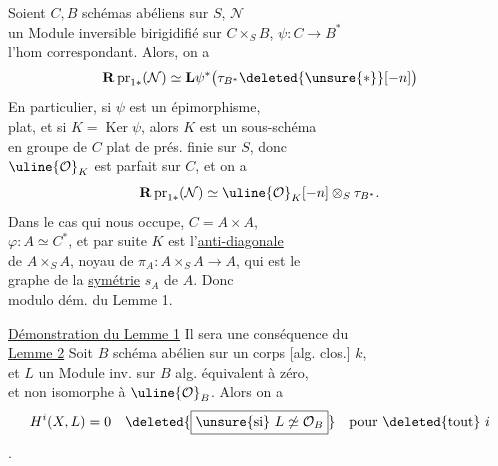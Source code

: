  Soient $C,B$ schémas abéliens sur $S$,  $\mathcal N$\\
un Module inversible birigidifié sur $C\times_S B$, $\psi:C\longrightarrow B^*$\\
l'hom correspondant. Alors, on a
\[
\mathbf R\operatorname{pr}_{1*}(\mathcal N)\simeq\mathbf L\psi^*\bigl(\tau_{B^*}\deleted{\unsure{*}}[-n]\bigr)
\]
En particulier, si $\psi$ est un épimorphisme, \\
plat, et si $K=\operatorname{Ker}\psi$, alors $K$ est un sous-schéma\\
en groupe de $C$ plat de prés. finie sur $S$, donc \\
$\uline{\mathcal O}_K$ est  parfait sur $C$, et on a
\[
\mathbf R\operatorname{pr}_{1*}(\mathcal N)\simeq\uline{\mathcal O}_K[-n]\otimes_S\tau_{B^*}.
\]
Dans le cas qui nous occupe, $C=A\times A$, \\
$\varphi:A\simeq C^*$, et  par suite $K$ est l'\uline{anti-diagonale}\\
de $A\times_S A$, noyau de $\pi_A:A\times_S A\longrightarrow A$, qui est le\\
graphe de la \uline{symétrie} $s_A$ de $A$. Donc \\
modulo dém. du Lemme 1.

\uline{Démonstration du Lemme 1} Il sera une conséquence du\\
\uline{Lemme 2}  Soit $B$ schéma abélien sur un corps [alg. clos.] $k$,\\
et $L$ un Module inv. sur $B$ alg. équivalent à zéro, \\
et non isomorphe à $\uline{\mathcal O}_B$. Alors on a
\[
H^i(X,L)=0\quad \deleted{\boxed{\unsure{\text{si}}\ L\not\simeq\mathcal O_B}}\quad\text{pour }\deleted{\text{tout}}\ i
\]
.


